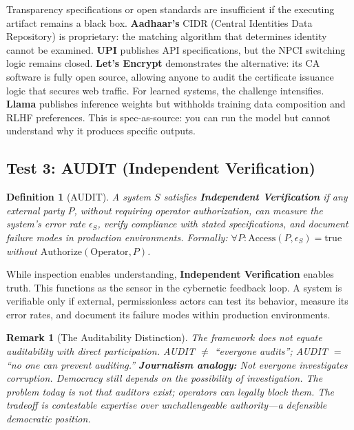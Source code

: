 \documentclass{article}
\newtheorem{definition}{Definition}
\newtheorem{remark}{Remark}
\begin{document}
Transparency specifications or open standards are insufficient if the executing artifact remains a black box. \textbf{Aadhaar's} CIDR (Central Identities Data Repository) is proprietary: the matching algorithm that determines identity cannot be examined. \textbf{UPI} publishes API specifications, but the NPCI switching logic remains closed. \textbf{Let's Encrypt} demonstrates the alternative: its CA software is fully open source, allowing anyone to audit the certificate issuance logic that secures web traffic. For learned systems, the challenge intensifies. \textbf{Llama} publishes inference weights but withholds training data composition and RLHF preferences. This is spec-as-source: you can run the model but cannot understand why it produces specific outputs.

\subsection{Test 3: AUDIT (Independent Verification)}

\begin{definition}[AUDIT]
\label{def:audit}
A system $S$ satisfies \textbf{Independent Verification} if any external party $P$, without requiring operator authorization, can measure the system's error rate $\epsilon_S$, verify compliance with stated specifications, and document failure modes in production environments. Formally: $\forall P: \text{Access}(P, \epsilon_S) = \text{true}$ without $\text{Authorize}(\text{Operator}, P)$.
\end{definition}

While inspection enables understanding, \textbf{Independent Verification} enables truth. This functions as the sensor in the cybernetic feedback loop. A system is verifiable only if external, permissionless actors can test its behavior, measure its error rates, and document its failure modes within production environments.

\begin{remark}[The Auditability Distinction]
The framework does not equate auditability with direct participation. AUDIT $\neq$ ``everyone audits''; AUDIT $=$ ``no one can prevent auditing.'' \textbf{Journalism analogy:} Not everyone investigates corruption. Democracy still depends on the \textit{possibility} of investigation. The problem today is not that auditors exist; operators can legally block them. The tradeoff is contestable expertise over unchallengeable authority---a defensible democratic position.
\end{remark}
\end{document}
